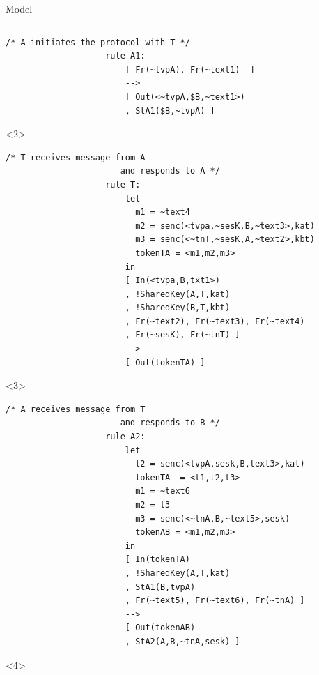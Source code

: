 \documentclass[11pt,aspectratio=169]{beamer}
\begin{document}
\begin{frame}[fragile]{Model}
\begin{columns}
\begin{column}{0.6\textwidth}
\begin{onlyenv}
\begin{lstlisting}[style=tamarin, gobble=20]
                    /* A initiates the protocol with T */
                    rule A1:
                        [ Fr(~tvpA), Fr(~text1)  ]
                        -->
                        [ Out(<~tvpA,$B,~text1>)
                        , StA1($B,~tvpA) ]
                \end{lstlisting}
            \end{onlyenv}
            \begin{onlyenv}<2>
                \begin{lstlisting}[style=tamarin, gobble=20]
                    /* T receives message from A
                       and responds to A */
                    rule T:
                        let
                          m1 = ~text4
                          m2 = senc(<tvpa,~sesK,B,~text3>,kat)
                          m3 = senc(<~tnT,~sesK,A,~text2>,kbt)
                          tokenTA = <m1,m2,m3>
                        in
                        [ In(<tvpa,B,txt1>)
                        , !SharedKey(A,T,kat)
                        , !SharedKey(B,T,kbt)
                        , Fr(~text2), Fr(~text3), Fr(~text4)
                        , Fr(~sesK), Fr(~tnT) ]
                        -->
                        [ Out(tokenTA) ]
                \end{lstlisting}
            \end{onlyenv}
            \begin{onlyenv}<3>
                \begin{lstlisting}[style=tamarin, gobble=20]
                    /* A receives message from T
                       and responds to B */
                    rule A2:
                        let
                          t2 = senc(<tvpA,sesk,B,text3>,kat)
                          tokenTA  = <t1,t2,t3>
                          m1 = ~text6
                          m2 = t3
                          m3 = senc(<~tnA,B,~text5>,sesk)
                          tokenAB = <m1,m2,m3>
                        in
                        [ In(tokenTA)
                        , !SharedKey(A,T,kat)
                        , StA1(B,tvpA)
                        , Fr(~text5), Fr(~text6), Fr(~tnA) ]
                        -->
                        [ Out(tokenAB)
                        , StA2(A,B,~tnA,sesk) ]
                \end{lstlisting}
            \end{onlyenv}
            \begin{onlyenv}<4>
                \begin{lstlisting}[style=tamarin, gobble=20]

\end{lstlisting}
\end{onlyenv}
\end{column}
\end{columns}
\end{frame}
\end{document}
